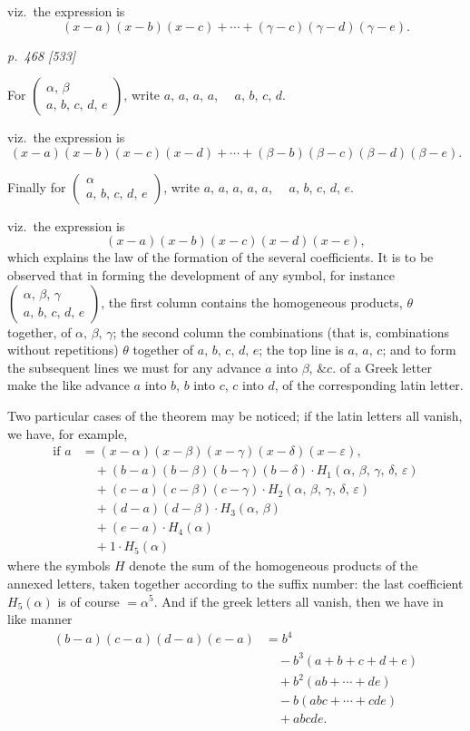 \documentclass[11pt,a4paper]{book}
\begin{document}
viz.\ the expression is
\[
(x-a)(x-b)(x-c)+\cdots+(\gamma-c)(\gamma-d)(\gamma-e).
\]

\clearpage

\bigskip
\textit{p.~468 [533]}
\smallskip

For $\begin{pmatrix} \alpha,\,\beta \\ a,\,b,\,c,\,d,\,e \end{pmatrix}$, write $a,\,a,\,a,\,a$, $\quad a,\,b,\,c,\,d$.

viz.\ the expression is
\[
(x-a)(x-b)(x-c)(x-d)+\cdots+(\beta-b)(\beta-c)(\beta-d)(\beta-e).
\]

Finally for $\begin{pmatrix} \alpha \\ a,\,b,\,c,\,d,\,e \end{pmatrix}$, write $a,\,a,\,a,\,a,\,a$, $\quad a,\,b,\,c,\,d,\,e$.

viz.\ the expression is
\[
(x-a)(x-b)(x-c)(x-d)(x-e),
\]
which explains the law of the formation of the several coefficients. It is to be observed
that in forming the development of any symbol, for instance $\begin{pmatrix} \alpha,\,\beta,\,\gamma \\ a,\,b,\,c,\,d,\,e \end{pmatrix}$, the first
column contains the homogeneous products, $\theta$ together, of $\alpha,\,\beta,\,\gamma$; the second column
the combinations (that is, combinations without repetitions) $\theta$ together of $a,\,b,\,c,\,d,\,e$;
the top line is $a,\,a,\,c$; and to form the subsequent lines we must for any
advance $a$ into $\beta$, $\&c.$ of a Greek letter make the like advance $a$ into $b$, $b$ into $c$,
$c$ into $d$, of the corresponding latin letter.

Two particular cases of the theorem may be noticed; if the latin letters all vanish,
we have, for example,
\begin{align*}
\text{if } a &= (x-\alpha)(x-\beta)(x-\gamma)(x-\delta)(x-\varepsilon), \\
&\quad +(b-a)(b-\beta)(b-\gamma)(b-\delta) \cdot H_1(\alpha,\,\beta,\,\gamma,\,\delta,\,\varepsilon) \\
&\quad +(c-a)(c-\beta)(c-\gamma) \cdot H_2(\alpha,\,\beta,\,\gamma,\,\delta,\,\varepsilon) \\
&\quad +(d-a)(d-\beta) \cdot H_3(\alpha,\,\beta) \\
&\quad +(e-a) \cdot H_4(\alpha) \\
&\quad +1 \cdot H_5(\alpha)
\end{align*}
where the symbols $H$ denote the sum of the homogeneous products of the annexed
letters, taken together according to the suffix number: the last coefficient $H_5(\alpha)$ is of
course $= \alpha^5$.  And if the greek letters all vanish, then we have in like manner
\begin{align*}
(b-a)(c-a)(d-a)(e-a) &= b^4 \\
&\quad -b^3(a+b+c+d+e) \\
&\quad +b^2(ab+\cdots+de) \\
&\quad -b(abc+\cdots+cde) \\
&\quad +abcde.
\end{align*}
\end{document}

